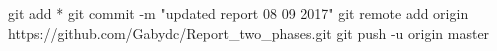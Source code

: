 git add *
git commit -m "updated report 08 09 2017"
git remote add origin https://github.com/Gabydc/Report_two_phases.git
git push -u origin master
